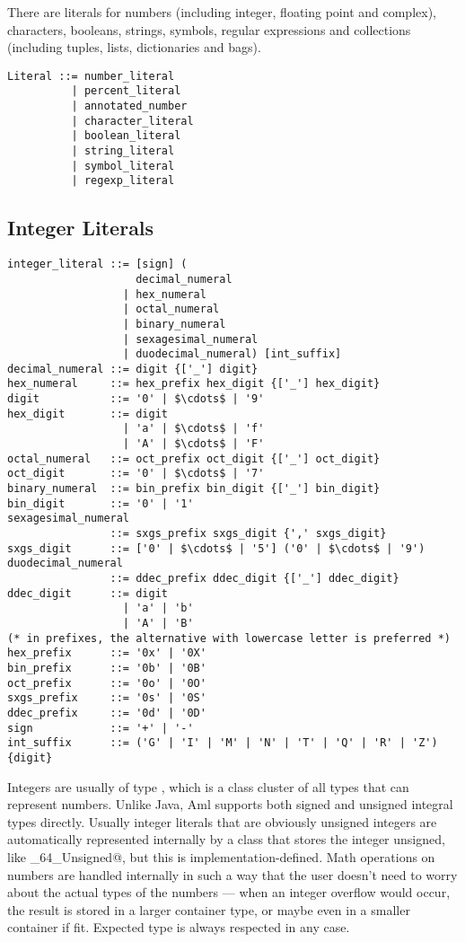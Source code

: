 There are literals for numbers (including integer, floating point and complex), characters, booleans, strings, symbols, regular expressions and collections (including tuples, lists, dictionaries and bags). 

\syntax\begin{lstlisting}
Literal ::= number_literal
          | percent_literal
          | annotated_number
          | character_literal
          | boolean_literal
          | string_literal
          | symbol_literal
          | regexp_literal
\end{lstlisting}






\subsection{Integer Literals}
\label{sec:integerliterals}

\syntax\begin{lstlisting}
integer_literal ::= [sign] (
                    decimal_numeral
                  | hex_numeral
                  | octal_numeral
                  | binary_numeral
                  | sexagesimal_numeral
                  | duodecimal_numeral) [int_suffix]
decimal_numeral ::= digit {['_'] digit}
hex_numeral     ::= hex_prefix hex_digit {['_'] hex_digit}
digit           ::= '0' | $\cdots$ | '9'
hex_digit       ::= digit 
                  | 'a' | $\cdots$ | 'f'
                  | 'A' | $\cdots$ | 'F'
octal_numeral   ::= oct_prefix oct_digit {['_'] oct_digit}
oct_digit       ::= '0' | $\cdots$ | '7'
binary_numeral  ::= bin_prefix bin_digit {['_'] bin_digit}
bin_digit       ::= '0' | '1'
sexagesimal_numeral
                ::= sxgs_prefix sxgs_digit {',' sxgs_digit}
sxgs_digit      ::= ['0' | $\cdots$ | '5'] ('0' | $\cdots$ | '9')
duodecimal_numeral
                ::= ddec_prefix ddec_digit {['_'] ddec_digit}
ddec_digit      ::= digit 
                  | 'a' | 'b'
                  | 'A' | 'B'
(* in prefixes, the alternative with lowercase letter is preferred *)
hex_prefix      ::= '0x' | '0X' 
bin_prefix      ::= '0b' | '0B'
oct_prefix      ::= '0o' | '0O'
sxgs_prefix     ::= '0s' | '0S'
ddec_prefix     ::= '0d' | '0D'
sign            ::= '+' | '-'
int_suffix      ::= ('G' | 'I' | 'M' | 'N' | 'T' | 'Q' | 'R' | 'Z') {digit}
\end{lstlisting}

Integers are usually of type \lstinline@Number@, which is a class cluster of all types that can represent numbers. Unlike Java, Aml supports both signed and unsigned integral types directly. Usually integer literals that are obviously unsigned integers are automatically represented internally by a class that stores the integer unsigned, like \lstinline@Integer_64_Unsigned@, but this is implementation-defined. Math operations on numbers are handled internally in such a way that the user doesn't need to worry about the actual types of the numbers — when an integer overflow would occur, the result is stored in a larger container type, or maybe even in a smaller container if fit. Expected type is always respected in any case. 

